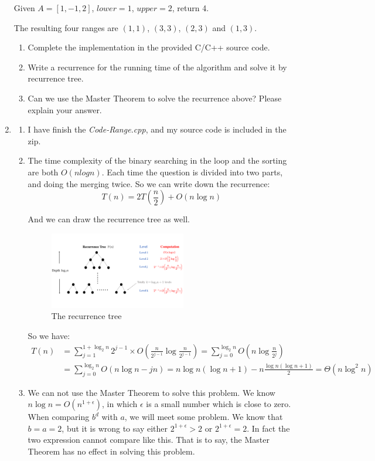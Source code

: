 \documentclass[12pt,a4paper]{article}
\makeatletter
\newtheorem*{solution}{Solution}
\theoremstyle{definition}
\renewenvironment{solution}[1][Solution] {\par\pushQED{\qed}\normalfont\topsep6\p@\@plus6\p@\relax\trivlist\item[\hskip\labelsep\bfseries#1\@addpunct{.}]\ignorespaces}{\popQED\endtrivlist\@endpefalse} \makeatother
\makeatother
\begin{document}
\begin{enumerate}
Given $A = [1,-1,2]$, $lower = 1$, $upper = 2$, return 4.

The resulting four ranges are $(1,1)$, $(3,3)$, $(2,3)$ and $(1,3)$.

\begin{enumerate}
\item
Complete the implementation in the provided C/C++ source code.
\item
Write a recurrence for the running time of the algorithm and solve it by recurrence tree.
\item
Can we use the Master Theorem to solve the recurrence above? Please explain your answer.
\end{enumerate}
\begin{solution}
\begin{enumerate}
\item I have finish the \textit{Code-Range.cpp}, and my source code is included in the zip.

\item The time complexity of the binary searching in the loop and the sorting are both $O(nlogn)$. Each time the question is divided into two parts, and doing the merging twice. So we can write down the recurrence:
$$T(n) = 2T(\frac{n}{2})+O(n\log n)$$

And we can draw the recurrence tree as well.
\begin{figure}[H]
    \centering
    \includegraphics[width=0.6\textwidth]{Fig-RecurrenceTree.pdf}
    \caption{The recurrence tree}\label{Fig-RecurrenceTree}
\end{figure}

So we have: 
\begin{align*}
T(n) &= \sum_{j=1}^{1+\log_2 n}2^{j-1}\times O(\frac{n}{2^{j-1}}\log \frac{n}{2^{j-1}}) = \sum_{j=0}^{\log_2 n}  O(n\log\frac{n}{2^j})\\
&=  \sum_{j=0}^{\log_2 n} O(n\log n - jn) = n\log n(\log n +1) - n\frac{\log n(\log n +1)}{2} = \Theta(n\log^2 n)
\end{align*}

\item 
We can not use the Master Theorem to solve this problem. We know $n\log n = O(n^{1+\epsilon})$, in which $\epsilon$ is a small number which is close to zero. When comparing $b^d$ with $a$, we will meet some problem. We know that $b = a = 2$, but it is wrong to say either $2^{1+\epsilon} > 2$ or $2^{1+\epsilon} = 2$. In fact the two expression cannot compare like this. That is to say, the Master Theorem has no effect in solving this problem.
 

\end{enumerate}
\end{solution}
\end{enumerate}
\end{document}
